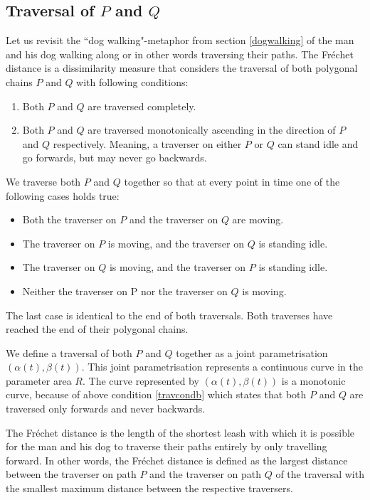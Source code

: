 \subsection{Traversal of $P$ and $Q$}

Let us revisit the ``dog walking"-metaphor from section \ref{dogwalking} of the man and his dog walking along or in other words traversing their paths. The Fréchet distance is a dissimilarity measure that considers the traversal of both polygonal chains $P$ and $Q$ with following conditions:
\begin{enumerate}[label=(\Alph*)]
	\item Both $P$ and $Q$ are traversed completely.
	\item Both $P$ and $Q$ are traversed monotonically ascending in the direction of $P$ and $Q$ respectively. Meaning, a traverser on either $P$ or $Q$ can stand idle and go forwards, but may never go backwards.\label{travcondb}
\end{enumerate}

We traverse both $P$ and $Q$ together so that at every point in time one of the following cases holds true:
\begin{itemize}
	\item Both the traverser on $P$ and the traverser on $Q$ are moving.
	\item The traverser on $P$ is moving, and the traverser on $Q$ is standing idle.
	\item The traverser on $Q$ is moving, and the traverser on $P$ is standing idle.
	\item Neither the traverser on P nor the traverser on $Q$ is moving.
\end{itemize}

The last case is identical to the end of both traversals. Both traverses have reached the end of their polygonal chains.

We define a traversal of both $P$ and $Q$ together as a joint parametrisation $(\alpha(t), \beta(t))$. This joint parametrisation represents a continuous curve in the parameter area $R$. The curve represented by $(\alpha(t), \beta(t))$ is a monotonic curve, because of above condition \ref{travcondb} which states that both $P$ and $Q$ are traversed only forwards and never backwards.

The Fréchet distance is the length of the shortest leash with which it is possible for the man and his dog to traverse their paths entirely by only travelling forward. In other words, the Fréchet distance is defined as the largest distance between the traverser on path $P$ and the traverser on path $Q$ of the traversal with the smallest maximum distance between the respective traversers.

